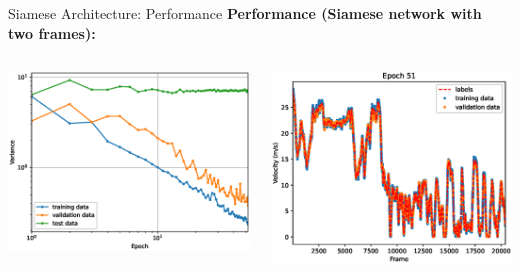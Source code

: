 \begin{frame}{Siamese Architecture: Performance}
	\textbf{Performance (Siamese network with two frames):}
	\begin{columns}[c]
		\begin{column}{0.5\textwidth}
			\includegraphics[width=\textwidth]{imgs/siamese_training.eps}
		\end{column}
		\begin{column}{0.5\textwidth}
			\includegraphics[width=\textwidth]{imgs/siamese_performance.eps}
		\end{column}
	\end{columns}
\end{frame}

